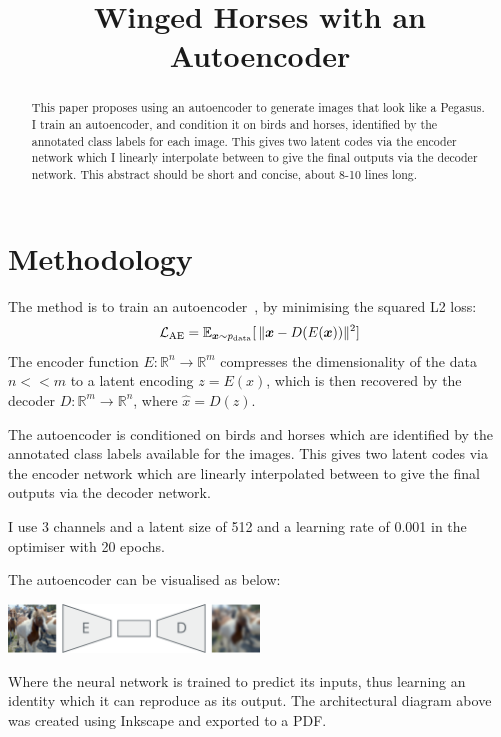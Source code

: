 \documentclass{article}
\title{Winged Horses with an Autoencoder}
\begin{document}
\maketitle
\begin{abstract}
    This paper proposes using an autoencoder to generate images that look like a Pegasus. 
    I train an autoencoder, and condition it on birds and horses, identified by the annotated class labels for each image. 
    This gives two latent codes via the encoder network which I linearly interpolate between to give the final outputs 
    via the decoder network. 
    This abstract should be short and concise, about 8-10 lines long.
\end{abstract}

\section{Methodology}
The method is to train an autoencoder~\cite{kramer1991nonlinear}, by minimising the squared L2 loss:
\begin{equation}
    \mathcal{L}_{\textrm{AE}} = \mathbb{E}_{{\bm{x}}\sim p_{\textrm{data}}}[\, \lVert {\bm{x}} - D(E({\bm{x}})) \rVert^2 ]
\end{equation}
The encoder function $E : \mathbb{R}^n \rightarrow\mathbb{R}^m$ compresses the dimensionality of the data $n << m$ to a latent encoding 
$z = E(x)$, which is then recovered by the decoder $D: \mathbb{R}^m \rightarrow \mathbb{R}^n$, where $\hat{x} = D(z)$. 

The autoencoder is conditioned on birds and horses which are identified by the annotated class labels available for the images. 
This gives two latent codes via the encoder network which are linearly interpolated between to give the final outputs via the decoder network. 

I use 3 channels and a latent size of 512 and a learning rate of 0.001 in the optimiser with 20 epochs.

The autoencoder can be visualised as below: 
\begin{center}
    \includegraphics[width=0.5\textwidth]{figures/architecture.pdf}
\end{center}
Where the neural network is trained to predict its inputs, thus learning an identity which it can reproduce as its output. 
The architectural diagram above was created using Inkscape and exported to a PDF. 
\end{document}
